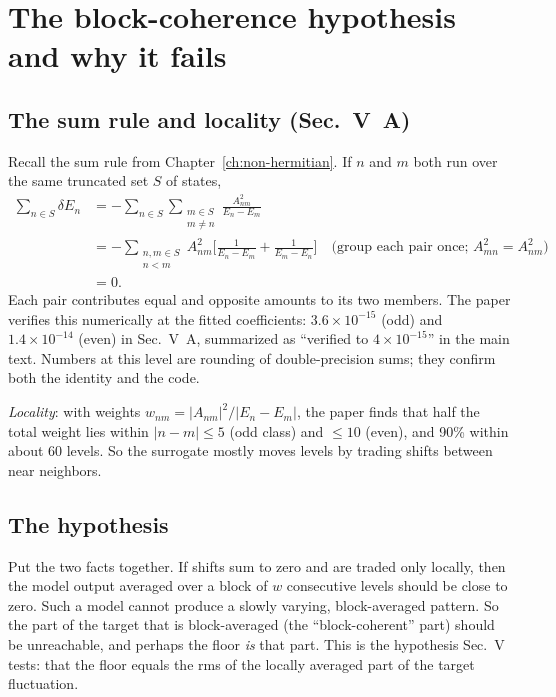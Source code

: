 \section{The block-coherence hypothesis and why it fails}\label{sec:paper-spurious-floor-blocks}

\subsection{The sum rule and locality (Sec.~V~A)}

Recall the sum rule from Chapter~\ref{ch:non-hermitian}. If $n$ and $m$ both run over the same truncated set $S$ of states,
\begin{align}
\sum_{n\in S}\delta E_n
&=-\sum_{n\in S}\sum_{\substack{m\in S\\m\ne n}}\frac{A_{nm}^2}{E_n-E_m}\nonumber\\
&=-\sum_{\substack{n,m\in S\\n<m}}A_{nm}^2\Big[\frac{1}{E_n-E_m}+\frac{1}{E_m-E_n}\Big]
\quad\text{(group each pair once; }A_{mn}^2=A_{nm}^2)\nonumber\\
&=0 .\label{eq:paper-spurious-floor-sumrule}
\end{align}
Each pair contributes equal and opposite amounts to its two members. The paper verifies this numerically at the fitted coefficients: $3.6\times10^{-15}$ (odd) and $1.4\times10^{-14}$ (even) in Sec.~V~A, summarized as ``verified to $4\times10^{-15}$'' in the main text. Numbers at this level are rounding of double-precision sums; they confirm both the identity and the code.

\emph{Locality}: with weights $w_{nm}=|A_{nm}|^2/|E_n-E_m|$, the paper finds that half the total weight lies within $|n-m|\le5$ (odd class) and $\le10$ (even), and 90\% within about 60 levels. So the surrogate mostly moves levels by trading shifts between near neighbors.

\subsection{The hypothesis}

Put the two facts together. If shifts sum to zero and are traded only locally, then the model output averaged over a block of $w$ consecutive levels should be close to zero. Such a model cannot produce a slowly varying, block-averaged pattern. So the part of the target that is block-averaged (the ``block-coherent'' part) should be unreachable, and perhaps the floor \emph{is} that part. This is the hypothesis Sec.~V tests: that the floor equals the rms of the locally averaged part of the target fluctuation.


